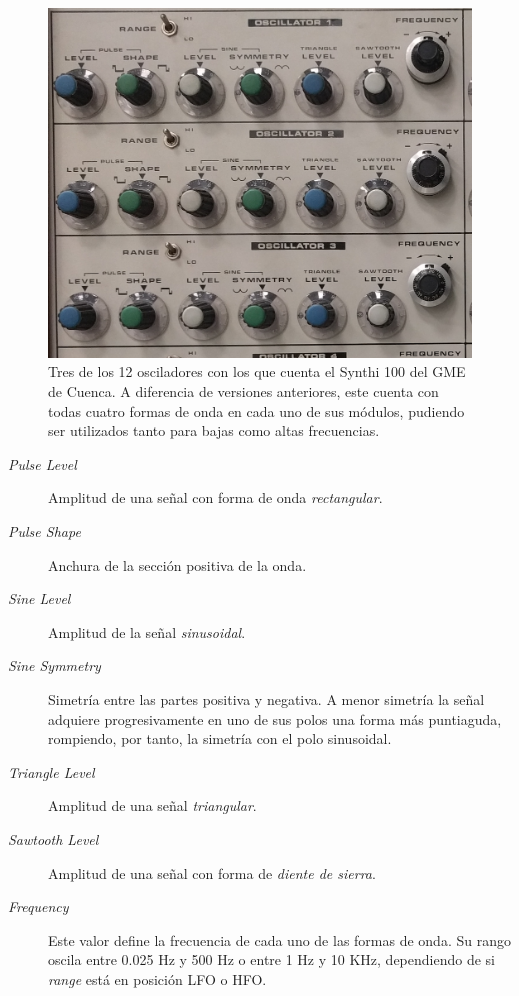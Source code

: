 \begin{figure}
	\centering
	\includegraphics[width=1\textwidth]{images/osciladores}
	\caption[Osciladores del Synthi 100 del GME]{Tres de los 12 osciladores con los que cuenta el Synthi 100 del GME de Cuenca. A diferencia de versiones anteriores, este cuenta con todas cuatro formas de onda en cada uno de sus módulos, pudiendo ser utilizados tanto para bajas como altas frecuencias.}
	\label{fig:osciladores}
\end{figure}

\begin{description}
	\item[\textit{Pulse Level}] Amplitud de una señal con forma de onda \textit{rectangular}. 
	\item[\textit{Pulse Shape}] Anchura de la sección positiva de la onda. 
	\item[\textit{Sine Level}] Amplitud de la señal \textit{sinusoidal}.
	\item[\textit{Sine Symmetry}] Simetría entre las partes positiva y negativa. A menor simetría la señal adquiere progresivamente en uno de sus polos una forma más puntiaguda, rompiendo, por tanto, la simetría con el polo sinusoidal. 
	\item[\textit{Triangle Level}] Amplitud de una señal \textit{triangular}.
	\item[\textit{Sawtooth Level}] Amplitud de una señal con forma de \textit{diente de sierra}.
	\item[\textit{Frequency}] Este valor define la frecuencia de cada uno de las formas de onda. Su rango oscila entre 0.025 Hz y 500 Hz o entre 1 Hz y 10 KHz, dependiendo de si \textit{range} está en posición LFO o HFO.  
\end{description}


